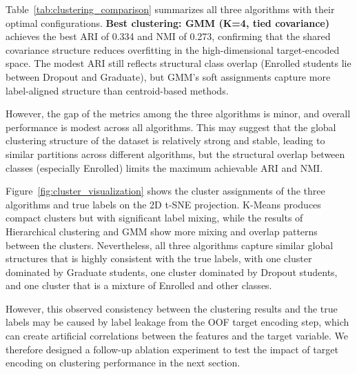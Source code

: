 \documentclass{article}
\begin{document}
Table~\ref{tab:clustering_comparison} summarizes all three algorithms with their optimal configurations. \textbf{Best clustering: GMM (K=4, tied covariance)} achieves the best ARI of 0.334 and NMI of 0.273, confirming that the shared covariance structure reduces overfitting in the high-dimensional target-encoded space. The modest ARI still reflects structural class overlap (Enrolled students lie between Dropout and Graduate), but GMM's soft assignments capture more label-aligned structure than centroid-based methods.

However, the gap of the metrics among the three algorithms is minor, and overall performance is modest across all algorithms. This may suggest that the global clustering structure of the dataset is relatively strong and stable, leading to similar partitions across different algorithms, but the structural overlap between classes (especially Enrolled) limits the maximum achievable ARI and NMI.

Figure~\ref{fig:cluster_visualization} shows the cluster assignments of the three algorithms and true labels on the 2D t-SNE projection. K-Means produces compact clusters but with significant label mixing, while the results of Hierarchical clustering and GMM show more mixing and overlap patterns between the clusters. Nevertheless, all three algorithms capture similar global structures that is highly consistent with the true labels, with one cluster dominated by Graduate students, one cluster dominated by Dropout students, and one cluster that is a mixture of Enrolled and other classes. 

However, this observed consistency between the clustering results and the true labels may be caused by label leakage from the OOF target encoding step, which can create artificial correlations between the features and the target variable. We therefore designed a follow-up ablation experiment to test the impact of target encoding on clustering performance in the next section.

\begin{table}[htbp]
\centering
\caption{Clustering algorithm performance comparison.}
\label{tab:clustering_comparison}
\end{table}
\end{document}
